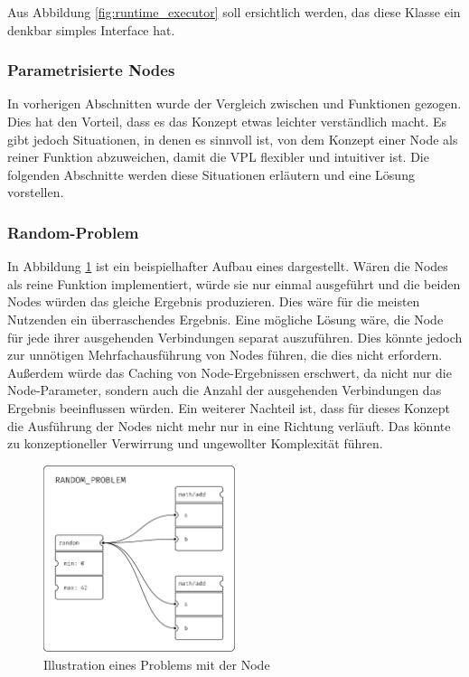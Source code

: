 \documentclass[ngerman]{article}
\begin{document}
Aus Abbildung \ref{fig:runtime_executor} soll ersichtlich werden, das diese Klasse ein denkbar simples Interface hat. 

\subsubsection{Parametrisierte Nodes}
\label{sec:parameter_nodes}
In vorherigen Abschnitten wurde der Vergleich zwischen  und Funktionen gezogen. Dies hat den Vorteil, dass es das Konzept etwas leichter verständlich macht.
Es gibt jedoch Situationen, in denen es sinnvoll ist, von dem Konzept einer Node als reiner Funktion abzuweichen, damit die VPL flexibler und intuitiver ist. Die folgenden Abschnitte werden diese Situationen erläutern und eine Lösung vorstellen.

\subsubsection*{Random-Problem}
In Abbildung \ref{fig:random_problem} ist ein beispielhafter Aufbau eines  dargestellt. Wären die  Nodes als reine Funktion implementiert, würde sie nur einmal ausgeführt und die beiden  Nodes würden das gleiche Ergebnis produzieren. Dies wäre für die meisten Nutzenden ein überraschendes Ergebnis.
\br
Eine mögliche Lösung wäre, die  Node für jede ihrer ausgehenden Verbindungen separat auszuführen. 
Dies könnte jedoch zur unnötigen Mehrfachausführung von Nodes führen, die dies nicht erfordern.
Außerdem würde das Caching von Node-Ergebnissen erschwert, da nicht nur die Node-Parameter, sondern auch die Anzahl der ausgehenden Verbindungen das Ergebnis beeinflussen würden.
\br
Ein weiterer Nachteil ist, dass für dieses Konzept die Ausführung der Nodes nicht mehr nur in eine Richtung verläuft. Das könnte zu konzeptioneller Verwirrung und ungewollter Komplexität führen.
\br
\begin{figure}[htbp]
  \centering
  \includegraphics[width=0.5\textwidth]{graphics/RANDOM_PROBLEM.pdf}
  \caption{Illustration eines Problems mit der  Node}
  \label{fig:random_problem}
\end{figure}
\end{document}
